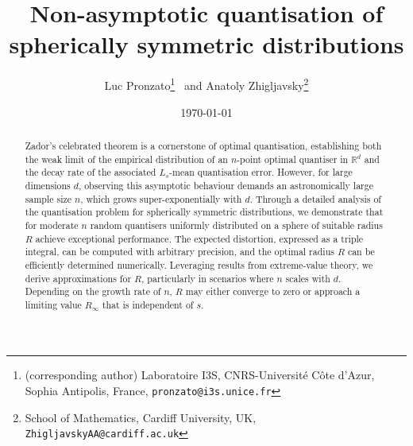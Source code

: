 \documentclass{article}
\def\RR{\mathds{R}}
\begin{document}

\title{Non-asymptotic quantisation of spherically symmetric distributions}



\author{Luc Pronzato\footnote{(corresponding author) Laboratoire I3S, CNRS-Universit\'e C\^ote d'Azur, Sophia Antipolis, France, {\tt pronzato@i3s.unice.fr}} \ and Anatoly Zhigljavsky\footnote{School of Mathematics, Cardiff University, UK, {\tt ZhigljavskyAA@cardiff.ac.uk}}}

\date{\today}

\maketitle

\begin{abstract}
Zador’s celebrated theorem is a cornerstone of optimal quantisation, establishing both the weak limit of the empirical distribution of an $n$-point optimal quantiser in $\RR^d$ and the decay rate of the associated $L_s$-mean quantisation error. However, for large dimensions $d$, observing this asymptotic behaviour demands an astronomically large sample size $n$, which grows super-exponentially with $d$. Through a detailed analysis of the quantisation problem for spherically symmetric distributions, we demonstrate that for moderate $n$ random quantisers uniformly distributed on a sphere of suitable radius $R$ achieve exceptional performance. The expected distortion, expressed as a triple integral, can be computed with arbitrary precision, and the optimal radius $R$ can be efficiently determined numerically. Leveraging results from extreme-value theory, we derive approximations for $R$, particularly in scenarios where $n$ scales with $d$. Depending on the growth rate of $n$, $R$ may either converge to zero or approach a limiting value $R_\infty$ that is independent of $s$.
\end{abstract}
\end{document}
